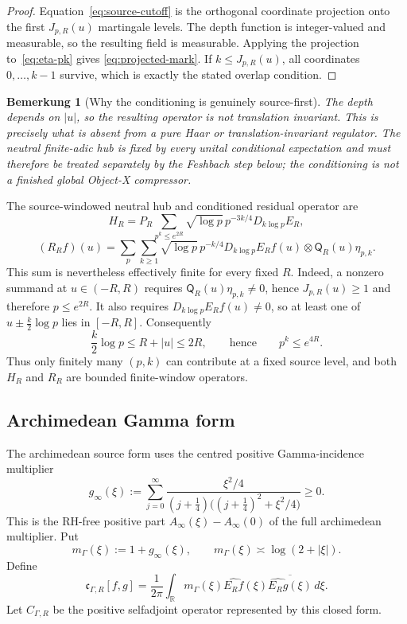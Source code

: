 \documentclass[11pt,a4paper]{amsart}
\newtheorem{remark}[theorem]{Bemerkung}
\begin{document}
\begin{proof}
Equation~\eqref{eq:source-cutoff} is the orthogonal coordinate projection onto the first
$J_{p,R}(u)$ martingale levels.  The depth function is integer-valued and measurable,
so the resulting field is measurable.  Applying the projection to~\eqref{eq:eta-pk} gives
\eqref{eq:projected-mark}.  If $k\le J_{p,R}(u)$, all coordinates $0,\dots,k-1$ survive, which is
exactly the stated overlap condition.
\end{proof}

\begin{remark}[Why the conditioning is genuinely source-first]\label{rem:sourcefirst}
The depth depends on $|u|$, so the resulting operator is not translation invariant.
This is precisely what is absent from a pure Haar or translation-invariant regulator.
The neutral finite-adic hub is fixed by every unital conditional expectation and must
therefore be treated separately by the Feshbach step below; the conditioning is not a
finished global Object-X compressor.
\end{remark}

The source-windowed neutral hub and conditioned residual operator are
\[
 \boxed{
 H_R
 =P_R\sum_{p^k\le e^{2R}}
 \sqrt{\log p}\,p^{-3k/4}D_{k\log p}E_R,
 }
\tag{2.5}\label{eq:hub-operator}
\]
\[
 \boxed{
 (R_Rf)(u)
 =\sum_p\sum_{k\ge1}
 \sqrt{\log p}\,p^{-k/4}
 D_{k\log p}E_Rf(u)\otimes\mathsf Q_R(u)\eta_{p,k}.
 }
\tag{2.6}\label{eq:rest-operator}
\]
This sum is nevertheless effectively finite for every fixed $R$.  Indeed, a nonzero
summand at $u\in(-R,R)$ requires $\mathsf Q_R(u)\eta_{p,k}\ne0$, hence
$J_{p,R}(u)\ge1$ and therefore $p\le e^{2R}$.  It also requires
$D_{k\log p}E_Rf(u)\ne0$, so at least one of $u\pm\frac{k}{2}\log p$ lies in
$[-R,R]$.  Consequently
\[
 \frac{k}{2}\log p\le R+|u|\le2R,
 \qquad\text{hence}\qquad p^k\le e^{4R}.
\]
Thus only finitely many $(p,k)$ can contribute at a fixed source level, and both $H_R$
and $R_R$ are bounded finite-window operators.

\subsection{Archimedean Gamma form}

The archimedean source form uses the centred positive Gamma-incidence
multiplier
\[
 \boxed{
 g_\infty(\xi)
 :=\sum_{j=0}^{\infty}
 \frac{\xi^2/4}
 {(j+\tfrac14)\bigl((j+\tfrac14)^2+\xi^2/4\bigr)}
 \ge0.
 }
\]
This is the RH-free positive part
$A_\infty(\xi)-A_\infty(0)$ of the full archimedean multiplier.  Put
\[
 m_\Gamma(\xi):=1+g_\infty(\xi),
 \qquad
 m_\Gamma(\xi)\asymp\log(2+|\xi|).
\tag{2.7}\label{eq:gamma-symbol}
\]
Define
\[
 \mathfrak c_{\Gamma,R}[f,g]
 =\frac1{2\pi}\int_{\mathbb R}
 m_\Gamma(\xi)\widehat{E_Rf}(\xi)
 \overline{\widehat{E_Rg}(\xi)}\,d\xi.
\tag{2.8}\label{eq:gamma-form}
\]
Let $C_{\Gamma,R}$ be the positive selfadjoint operator represented by this closed form.
\end{document}
